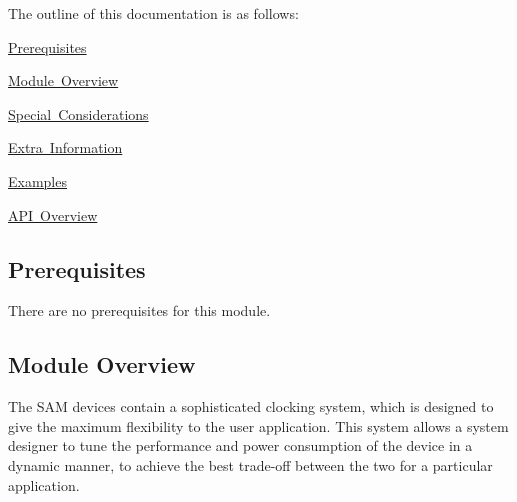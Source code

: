The outline of this documentation is as follows\+:
\begin{DoxyItemize}
\item \mbox{\hyperlink{group__asfdoc__sam0__system__clock__group_asfdoc_sam0_system_clock_prerequisites}{Prerequisites}}
\item \mbox{\hyperlink{group__asfdoc__sam0__system__clock__group_asfdoc_sam0_system_clock_module_overview}{Module Overview}}
\item \mbox{\hyperlink{group__asfdoc__sam0__system__clock__group_asfdoc_sam0_system_clock_special_considerations}{Special Considerations}}
\item \mbox{\hyperlink{group__asfdoc__sam0__system__clock__group_asfdoc_sam0_system_clock_extra_info}{Extra Information}}
\item \mbox{\hyperlink{group__asfdoc__sam0__system__clock__group_asfdoc_sam0_system_clock_examples}{Examples}}
\item \mbox{\hyperlink{group__asfdoc__sam0__system__clock__group_asfdoc_sam0_system_clock_api_overview}{A\+PI Overview}}
\end{DoxyItemize}\hypertarget{group__asfdoc__sam0__system__clock__group_asfdoc_sam0_system_clock_prerequisites}{}\subsection{Prerequisites}\label{group__asfdoc__sam0__system__clock__group_asfdoc_sam0_system_clock_prerequisites}
There are no prerequisites for this module.\hypertarget{group__asfdoc__sam0__system__clock__group_asfdoc_sam0_system_clock_module_overview}{}\subsection{Module Overview}\label{group__asfdoc__sam0__system__clock__group_asfdoc_sam0_system_clock_module_overview}
The S\+AM devices contain a sophisticated clocking system, which is designed to give the maximum flexibility to the user application. This system allows a system designer to tune the performance and power consumption of the device in a dynamic manner, to achieve the best trade-\/off between the two for a particular application.


